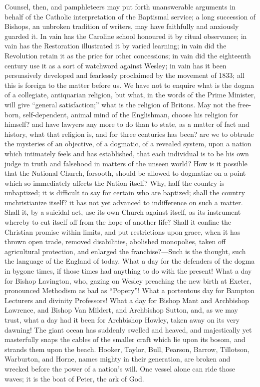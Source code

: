 Counsel, then, and pamphleteers may put forth unanswerable
arguments in behalf of the Catholic interpretation of the Baptismal
service; a long succession of Bishops, an unbroken tradition of
writers, may have faithfully and anxiously guarded it. In vain has the
Caroline school honoured it by ritual observance; in vain has the
Restoration illustrated it by varied learning; in vain did the
Revolution retain it as the price for other concessions; in vain did
the eighteenth century use it as a sort of watchword against Wesley;
in vain has it been persuasively developed and fearlessly proclaimed
by the movement of 1833; all this is foreign to the matter before us.
We have not to enquire what is the dogma of a collegiate, antiquarian
religion, but what, in the words of the Prime Minister, will give
``general satisfaction;'' what is the religion of Britons. May
not the free-born, self-dependent, animal mind of the Englishman,
choose his religion for himself? and have lawyers any more to do than
to state, as a matter of fact and history, what that religion is, and
for three centuries has been? are we to obtrude the mysteries of an
objective, of a dogmatic, of a revealed system, upon a nation which
intimately feels and has established, that each individual is to be
his own judge in truth and falsehood in matters of the unseen world?
How is it possible that the National Church, forsooth, should be
allowed to dogmatize on a point which so immediately affects the
Nation itself? Why, half the country is unbaptized; it is difficult to
say for certain who are baptized; shall the country unchristianize
itself? it has not yet advanced to indifference on such a matter.
Shall it, by a suicidal act, use its own Church against itself, as its
instrument whereby to cut itself off from the hope of another life?
Shall it confine the Christian promise within limits, and put
restrictions upon grace, when it has thrown open trade, removed
disabilities, abolished monopolies, taken off agricultural protection,
and enlarged the franchise?—Such is the thought, such the language
of the England of today. What a day for the defenders of the dogma in
bygone times, if those times had anything to do with the present! What
a day for Bishop Lavington, who, gazing on Wesley preaching the new
birth at Exeter, pronounced Methodism as bad as ``Popery''!
What a portentous day for Bampton Lecturers and divinity Professors!
What a day for Bishop Mant and Archbishop Lawrence, and Bishop Van
Mildert, and Archbishop Sutton, and, as we may trust, what a day had
it been for Archbishop Howley, taken away on its very dawning! The
giant ocean has suddenly swelled and heaved, and majestically yet
masterfully snaps the cables of the smaller craft which lie upon its
bosom, and strands them upon the beach. Hooker, Taylor, Bull, Pearson,
Barrow, Tillotson, Warburton, and Horne, names mighty in their
generation, are broken and wrecked before the power of a nation's
will. One vessel alone can ride those waves; it is the boat of Peter,
the ark of God.


